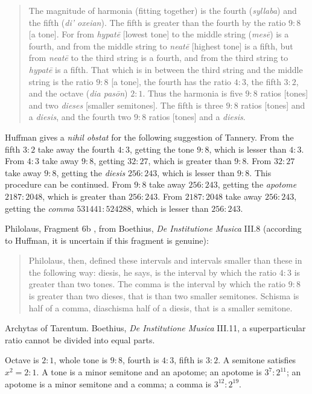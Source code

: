 \documentclass{amsart}
\theoremstyle{definition}
\begin{document}
\begin{quote}
The magnitude of harmonia (fitting together) is the fourth ({\em syllaba}) and the fifth ({\em di' oxeian}). The fifth is greater than the fourth
by the ratio $9:8$ [a tone]. For from {\em hypat\={e}} [lowest tone] to the middle string ({\em mes\={e}}) is a fourth, and from the middle string to {\em neat\={e}} [highest tone] is a
fifth, but from {\em neat\={e}} to the third string is a fourth, and from the third string to {\em hypat\={e}} is a fifth. That which is in between the third string and the middle string is the
ratio $9:8$ [a tone], the fourth has the ratio $4:3$, the fifth $3:2$, and the octave ({\em dia pas\={o}n}) $2:1$. Thus the harmonia is five $9:8$ ratios [tones] and two {\em dieses}
 [smaller semitones]. The fifth is three $9:8$ ratios [tones] and a {\em diesis}, and the fourth two $9:8$ ratios [tones] and a {\em diesis}.
\end{quote}

Huffman \cite[p.~164]{philolaus} gives a {\em nihil obstat} for the following suggestion of Tannery. 
From the fifth $3:2$ take away the fourth $4:3$, getting the tone $9:8$, which is lesser than $4:3$.
From $4:3$ take away $9:8$, getting $32:27$, which is greater than $9:8$. From
$32:27$ take away $9:8$, getting the {\em diesis} $256:243$, which is lesser than $9:8$. This procedure can be continued.
From $9:8$ take away $256:243$, getting the {\em apotome} $2187:2048$, which is greater than $256:243$. From
$2187:2048$ take away $256:243$, getting the {\em comma} $531441:524288$, which is lesser than $256:243$. 

Philolaus, Fragment 6b \cite[p.~364]{philolaus}, from Boethius, {\em De Institutione Musica} III.8 (according to Huffman, it is uncertain if this fragment is genuine):

\begin{quote}
Philolaus, then, defined these intervals and intervals smaller than these in the following way: diesis, he says, is the interval by which the ratio
$4:3$ is greater than two tones. The comma is the interval by which the ratio $9:8$ is greater than two dieses, that is than two smaller semitones. Schisma is half of a comma,
 diaschisma half of a diesis, that is a smaller semitone.
\end{quote}

Archytas of Tarentum. Boethius, {\em De Institutione Musica} III.11, a superparticular ratio cannot be divided into equal parts.

Octave is $2:1$, whole tone is $9:8$, fourth is $4:3$, fifth is $3:2$. A semitone satisfies $x^2=2:1$. A tone is a minor semitone and an apotome;
an apotome is $3^7:2^{11}$; an apotome is a minor semitone and a comma; a comma is $3^{12}:2^{19}$.
\end{document}
